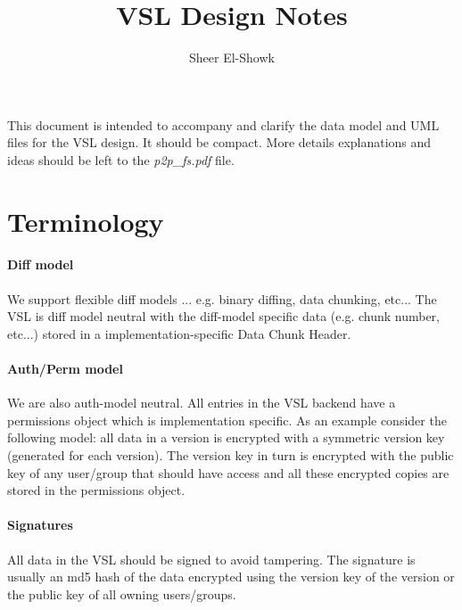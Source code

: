 \documentclass[10pt]{article}
\begin{document}
\title{VSL Design Notes}
\author{Sheer El-Showk}
\maketitle



%
%


%
%

\tableofcontents
\newpage

This document is intended to accompany and clarify the data model and UML files for the VSL design.  It should be compact.  More details explanations and ideas should be left to the {\em p2p\_fs.pdf} file.

\section{Terminology}

\paragraph{Diff model} 

We support flexible diff models ... e.g. binary diffing, data chunking, etc...  The VSL is diff model neutral with the diff-model specific data (e.g. chunk number, etc...) stored in a implementation-specific Data Chunk Header.

\paragraph{Auth/Perm model}

We are also auth-model neutral.  All entries in the VSL backend have a permissions object which is implementation specific.  As an example consider the following model:  all data in a version is encrypted with a symmetric version key (generated for each version).  The version key in turn is encrypted with the public key of any user/group that should have access and all these encrypted copies are stored in the permissions object.  

\paragraph{Signatures}

All data in the VSL should be signed to avoid tampering.  The signature is usually an md5 hash of the data encrypted using the version key of the version or the public key of all owning users/groups.
\end{document}
